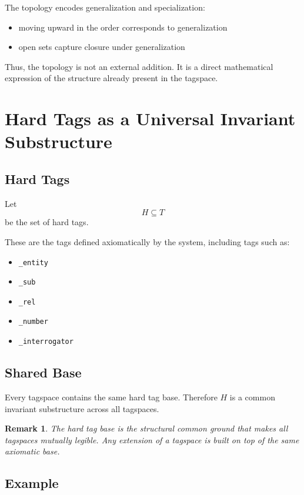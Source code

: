 \documentclass{article}
\newtheorem{remark}{Remark}[section]
\begin{document}
The topology encodes generalization and specialization:

\begin{itemize}
    \item moving upward in the order corresponds to generalization
    \item open sets capture closure under generalization
\end{itemize}

Thus, the topology is not an external addition. It is a direct
mathematical expression of the structure already present in the tagspace.

\section{Hard Tags as a Universal Invariant Substructure}

\subsection{Hard Tags}

Let
\[
H \subseteq T
\]
be the set of hard tags.

These are the tags defined axiomatically by the system, including tags
such as:

\begin{itemize}
    \item \texttt{\_entity}
    \item \texttt{\_sub}
    \item \texttt{\_rel}
    \item \texttt{\_number}
    \item \texttt{\_interrogator}
\end{itemize}

\subsection{Shared Base}

Every tagspace contains the same hard tag base. Therefore $H$ is a common
invariant substructure across all tagspaces.

\begin{remark}
The hard tag base is the structural common ground that makes all tagspaces
mutually legible. Any extension of a tagspace is built on top of the same
axiomatic base.
\end{remark}

\subsection{Example}
\end{document}
